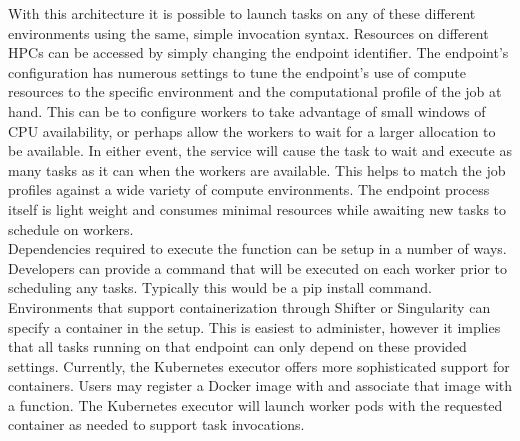 With this architecture it is possible to launch tasks on any of these different environments using the same, simple invocation syntax.
Resources on different HPCs can be accessed by simply changing the endpoint identifier.
The endpoint's configuration has numerous settings to tune the endpoint's use of compute resources to the specific environment and the computational profile of the job at hand.
This can be to configure workers to take advantage of small windows of CPU availability, or perhaps allow the workers to wait for a larger allocation to be available.
In either event, the \funcX{} service will cause the task to wait and execute as many tasks as it can when the workers are available.
This helps to match the job profiles against a wide variety of compute environments.
The endpoint process itself is light weight and consumes minimal resources while awaiting new tasks to schedule on workers.\\

Dependencies required to execute the function can be setup in a number of ways.
Developers can provide a command that will be executed on each worker prior to scheduling any tasks.
Typically this would be a pip install command. Environments that support containerization through Shifter or Singularity can specify a container in the setup.
This is easiest to administer, however it implies that all tasks running on that endpoint can only depend on these provided settings.
Currently, the Kubernetes executor offers more sophisticated support for containers.
Users may register a Docker image with \funcX{} and associate that image with a function.
The Kubernetes executor will launch worker pods with the requested container as needed to support task invocations.
